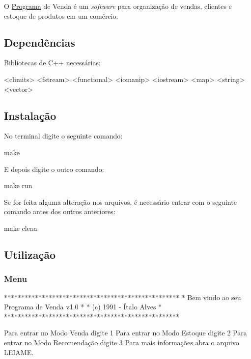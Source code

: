 O \hyperlink{class_programa}{Programa} de Venda é um {\itshape software} para organização de vendas, clientes e estoque de produtos em um comércio.

\subsection*{Dependências}

Bibliotecas de C++ necessárias\+:


\begin{DoxyCode}
<climits>
<fstream>
<functional>
<iomanip>
<iostream>
<map>
<string>
<vector>
\end{DoxyCode}


\subsection*{Instalação}

No terminal digite o seguinte comando\+:


\begin{DoxyCode}
make
\end{DoxyCode}


E depois digite o outro comando\+:


\begin{DoxyCode}
make run
\end{DoxyCode}


Se for feita alguma alteração nos arquivos, é necessário entrar com o seguinte comando antes dos outros anteriores\+:


\begin{DoxyCode}
make clean
\end{DoxyCode}


\subsection*{Utilização}

\subsubsection*{Menu}

\begin{DoxyVerb}    ***************************************************
    *     Bem vindo ao seu Programa de Venda v1.0     *
    *             (c) 1991 - Ítalo Alves              *
    ***************************************************

    Para entrar no Modo Venda digite 1
    Para entrar no Modo Estoque digite 2
    Para entrar no Modo Recomendação digite 3
    Para mais informações abra o arquivo LEIAME.
\end{DoxyVerb}



